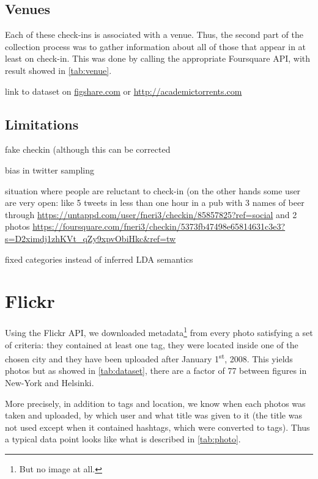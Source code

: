 \subsection{Venues}

Each of these check-ins is associated with a venue. Thus, the second part of
the collection process was to gather information about all of those
 that appear in at least on check-in. This was done by calling the
appropriate Foursquare API, with result showed in \autoref{tab:venue}.

link to dataset on
\href{http://figshare.com/authors/G\%C3\%A9raud\%20Le\%20Falher/542931}%
{\url{figshare.com}} or \url{http://academictorrents.com}

\subsection{Limitations}

fake checkin\autocite{FakeCheckins12} (although this can be corrected
\autocite{ValidateCheckin13,FindingFake14}

bias in twitter sampling\autocite{TwitterBias14}

situation where people are reluctant to check-in\autocite{Privacy11} (on the
other hands some user are very open: like 5 tweets in less than one hour in a
pub with 3 names of beer through
\url{https://untappd.com/user/fneri3/checkin/85857825?ref=social} and 2 photos
\url{https://foursquare.com/fneri3/checkin/5373fb47498e65814631c3e3?s=D2ximdj1zhKVt_qZy9xpvObiHkc&ref=tw}

fixed categories instead of inferred LDA semantics\autocite{PlaceSemantic14}

\section{Flickr}

Using the Flickr API, we downloaded metadata\footnote{But no image at all.}
from every photo satisfying a set of criteria: they contained at least one
tag, they were located inside one of the chosen city and they have been
uploaded after January 1\textsuperscript{st}, 2008. This yields
 photos but as showed in \autoref{tab:dataset}, there are a
factor of 77 between figures in New-York and Helsinki.

More precisely, in addition to tags and location, we know when each photos was
taken and uploaded, by which user and what title was given to it (the title
was not used except when it contained hashtags, which were converted to tags).
Thus a typical data point looks like what is described in \autoref{tab:photo}.

